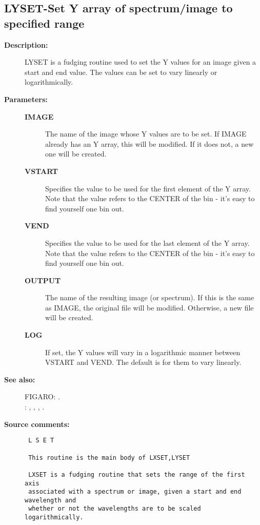 \subsection{LYSET-\label{LYSET}Set Y array of spectrum/image to specified range}
\begin{description}

\item [{\bf Description:}]
 LYSET is a fudging routine used to set the Y values for an image
 given a start and end value.  The values can be set
 to vary linearly or logarithmically.

\item [{\bf Parameters:}]
\begin{description}
\item [{\bf IMAGE}]
 The name of the image whose Y values are to be set.
 If IMAGE already has an Y array, this will be modified.
 If it does not, a new one will be created.
\item [{\bf VSTART}]
 Specifies the value to be used for the first
 element of the Y array.
 Note that the value refers to the CENTER of the
 bin - it's easy to find yourself one bin out.
\item [{\bf VEND}]
 Specifies the value to be used for the last
 element of the Y array.
 Note that the value refers to the CENTER of the
 bin - it's easy to find yourself one bin out.
\item [{\bf OUTPUT}]
 The name of the resulting image (or spectrum).
 If this is the same as IMAGE, the original file
 will be modified.  Otherwise, a new file will be created.
\item [{\bf LOG}]
 If set, the Y values will vary in a logarithmic
 manner between VSTART and VEND.  The default is
 for them to vary linearly.
\end{description}

\item [{\bf See also:}]
FIGARO: .\\
: , , , .\\

\item [{\bf Source comments:}]
\begin{verbatim}
 L S E T

 This routine is the main body of LXSET,LYSET

 LXSET is a fudging routine that sets the range of the first axis
 associated with a spectrum or image, given a start and end wavelength and
 whether or not the wavelengths are to be scaled logarithmically.


\end{verbatim}
\end{description}
